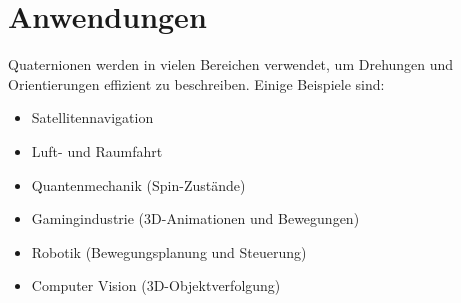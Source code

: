 %
%
%
%
\section{Anwendungen\label{qa:section:anwendungen}}
Quaternionen werden in vielen Bereichen verwendet, um Drehungen und 
Orientierungen effizient zu beschreiben. Einige Beispiele sind:

\begin{itemize}
    \item Satellitennavigation
    \item Luft- und Raumfahrt
    \item Quantenmechanik (Spin-Zustände)
    \item Gamingindustrie (3D-Animationen und Bewegungen)
    \item Robotik (Bewegungsplanung und Steuerung)
    \item Computer Vision (3D-Objektverfolgung)
\end{itemize}